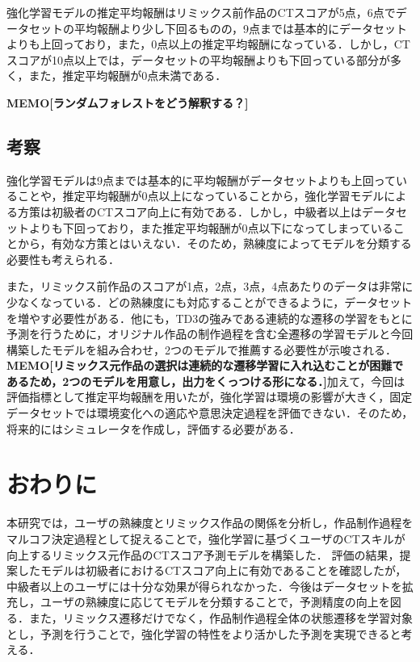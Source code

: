 \documentclass[submit,techrep,noauthor]{ipsj}
\newcommand{\memo}[1]{\colorbox{magenta!30}{\textbf{MEMO}}{\color{red!50}\textbf{[#1]}}}
\begin{document}
強化学習モデルの推定平均報酬はリミックス前作品のCTスコアが5点，6点でデータセットの平均報酬より少し下回るものの，9点までは基本的にデータセットよりも上回っており，また，0点以上の推定平均報酬になっている．しかし，CTスコアが10点以上では，データセットの平均報酬よりも下回っている部分が多く，また，推定平均報酬が0点未満である．

\memo{ランダムフォレストをどう解釈する？}

\subsection{考察}
強化学習モデルは9点までは基本的に平均報酬がデータセットよりも上回っていることや，推定平均報酬が0点以上になっていることから，強化学習モデルによる方策は初級者のCTスコア向上に有効である．しかし，中級者以上はデータセットよりも下回っており，また推定平均報酬が0点以下になってしまっていることから，有効な方策とはいえない．そのため，熟練度によってモデルを分類する必要性も考えられる．

また，リミックス前作品のスコアが1点，2点，3点，4点あたりのデータは非常に少なくなっている．どの熟練度にも対応することができるように，データセットを増やす必要性がある．他にも，TD3の強みである連続的な遷移の学習をもとに予測を行うために，オリジナル作品の制作過程を含む全遷移の学習モデルと今回構築したモデルを組み合わせ，2つのモデルで推薦する必要性が示唆される．\memo{リミックス元作品の選択は連続的な遷移学習に入れ込むことが困難であるため，2つのモデルを用意し，出力をくっつける形になる．}加えて，今回は評価指標として推定平均報酬を用いたが，強化学習は環境の影響が大きく，固定データセットでは環境変化への適応や意思決定過程を評価できない．そのため，将来的にはシミュレータを作成し，評価する必要がある．


\section{おわりに}
\label{sec:conclusion}
本研究では，ユーザの熟練度とリミックス作品の関係を分析し，作品制作過程をマルコフ決定過程として捉えることで，強化学習に基づくユーザのCTスキルが向上するリミックス元作品のCTスコア予測モデルを構築した．
評価の結果，提案したモデルは初級者におけるCTスコア向上に有効であることを確認したが，中級者以上のユーザには十分な効果が得られなかった．今後はデータセットを拡充し，ユーザの熟練度に応じてモデルを分類することで，予測精度の向上を図る．また，リミックス遷移だけでなく，作品制作過程全体の状態遷移を学習対象とし，予測を行うことで，強化学習の特性をより活かした予測を実現できると考える．





\end{document}
